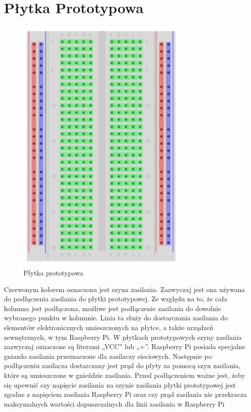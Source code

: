 \section{Płytka Prototypowa}
\begin{figure}[htbp]
	\centering
	\includegraphics[width=0.5\linewidth, height=13cm]{"obrazy/Breadboard"}
	\caption{Płytka prototypowa}
	\label{fig:3}
\end{figure}
Czerwonym kolorem oznaczona jest szyna zasilania. Zazwyczaj jest ona używana do podłączenia zasilania do płytki prototypowej. Ze względu na to, że cała kolumna jest podłączona, możliwe jest podłączenie zasilania do dowolnie wybranego punktu w kolumnie. Linia ta służy do dostarczania zasilania do elementów elektronicznych umieszczonych na płytce, a także urządzeń zewnętrznych, w tym Raspberry Pi. W płytkach prototypowych szyny zasilania zazwyczaj oznaczone są literami „VCC” lub „+”. Raspberry Pi posiada specjalne gniazdo zasilania przeznaczone dla zasilaczy sieciowych. Następnie po podłączeniu zasilacza dostarczany jest prąd do płyty za pomocą szyn zasilania, które są umieszczone w gnieździe zasilania. Przed podłączeniem ważne jest, żeby się upewnić czy napięcie zasilania na szynie zasilania płytki prototypowej jest zgodne z napięciem zasilania Raspberry Pi oraz czy prąd zasilania nie przekracza maksymalnych wartości dopuszczalnych dla linii zasilania w Raspberry Pi
